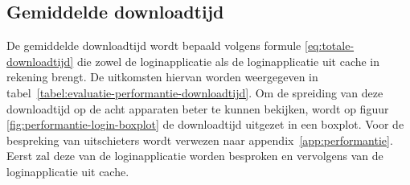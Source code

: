 
\subsection{Gemiddelde downloadtijd}
\label{sec:evaluatie-downloadtijd}

\begin{table}
\centering
{}
\caption{Gemiddelde downloadtijd van de loginapplicatie.}
\label{tabel:evaluatie-performantie-downloadtijd}
\end{table}

De gemiddelde downloadtijd wordt bepaald volgens formule \ref{eq:totale-downloadtijd} die zowel de loginapplicatie als de loginapplicatie uit cache in rekening brengt.
De uitkomsten hiervan worden weergegeven in tabel~\ref{tabel:evaluatie-performantie-downloadtijd}.
Om de spreiding van deze downloadtijd op de acht apparaten beter te kunnen bekijken, wordt op figuur \ref{fig:performantie-login-boxplot} de downloadtijd uitgezet in een boxplot.
Voor de bespreking van uitschieters wordt verwezen naar appendix~\ref{app:performantie}. 
Eerst zal deze van de loginapplicatie worden besproken en vervolgens van de loginapplicatie uit cache.

